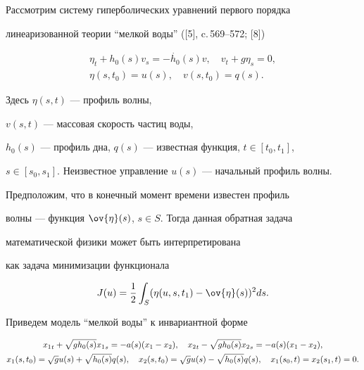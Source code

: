 Рассмотрим систему гиперболических уравнений первого порядка 


линеаризованной теории ``мелкой воды'' ([5], c.\,569--572; [8])


\begin{gather*}


\eta_t+h_0(s)v_s=-\Dot{h_0}(s)v,\quad


v_t+g\eta_s=0,\\


\eta(s,t_0)=u(s),\quad v(s,t_0)=q(s).


\end{gather*}


Здесь $\eta(s,t)$ --- профиль волны,


$v(s,t)$ --- массовая скорость частиц воды,


$h_0(s)$ --- профиль дна, $q(s)$ --- известная функция, $t\in [t_0,t_1]$, 


$s\in[s_0,s_1].$ Неизвестное управление $u(s)$ --- начальный профиль волны.





Предположим, что в конечный момент времени известен профиль 


волны --- функция $\ov{\eta}(s)$, $s\in S$. Тогда данная обратная задача 


математической физики может быть интерпретирована


как задача минимизации функционала


$$


J(u)=\frac{1}{2}\int_S (\eta(u,s,t_1)-\ov{\eta}(s))^2 ds.


$$





Приведем модель ``мелкой воды'' к инвариантной форме


\begin{gather}


{x_1}_t+\sqrt{gh_0(s)}{x_1}_s=-a(s)(x_1-x_2),\quad


{x_2}_t-\sqrt{gh_0(s)}{x_2}_s=-a(s)(x_1-x_2), \label{mets} \\


%


x_1(s,t_0)=\sqrt{g}u(s)+\sqrt{h_0(s)}q(s),\quad


x_2(s,t_0)=\sqrt{g}u(s)-\sqrt{h_0(s)}q(s),\quad


x_1(s_0,t)=x_2(s_1,t)=0.\notag


\end{gather}


